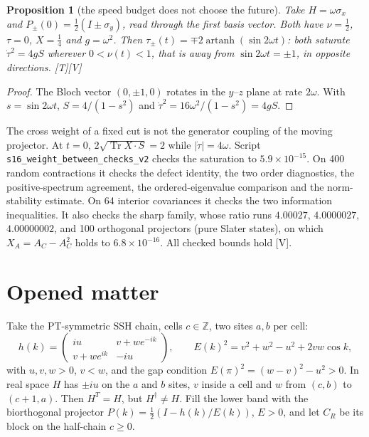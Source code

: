 \documentclass[11pt]{article}
\newtheorem{proposition}[theorem]{Proposition}
\theoremstyle{definition}
\newcommand{\grade}[1]{\textsf{\small[#1]}}
\newcommand{\Tr}{\operatorname{Tr}}
\begin{document}
\begin{proposition}[the speed budget does not choose the future]\label{prop:joint}
Take $H=\omega\sigma_x$ and $P_\pm(0)=\tfrac12(I\pm\sigma_y)$, read through the first basis vector. Both have $\nu=\tfrac12$, $\tau=0$, $X=\tfrac14$ and $g=\omega^2$. Then $\tau_\pm(t)=\mp2\operatorname{artanh}(\sin2\omega t)$: both saturate $\dot\tau^2=4gS$ wherever $0<\nu(t)<1$, that is away from $\sin2\omega t=\pm1$, in opposite directions. \grade{T}\grade{V}
\end{proposition}
\begin{proof}
The Bloch vector $(0,\pm1,0)$ rotates in the $y$--$z$ plane at rate $2\omega$. With $s=\sin2\omega t$, $S=4/(1-s^2)$ and $\dot\tau^2=16\omega^2/(1-s^2)=4gS$.
\end{proof}
The cross weight of a fixed cut is not the generator coupling of the moving projector. At $t=0$, $2\sqrt{\Tr X\cdot S}=2$ while $|\dot\tau|=4\omega$. Script \texttt{s16\_weight\_between\_checks\_v2} checks the saturation to $5.9\times10^{-15}$. On 400 random contractions it checks the defect identity, the two order diagnostics, the positive-spectrum agreement, the ordered-eigenvalue comparison and the norm-stability estimate. On 64 interior covariances it checks the two information inequalities. It also checks the sharp family, whose ratio runs $4.00027$, $4.0000027$, $4.00000002$, and 100 orthogonal projectors (pure Slater states), on which $X_A=A_C-A_C^2$ holds to $6.8\times10^{-16}$. All checked bounds hold \grade{V}.

\section{Opened matter}\label{sec:opened}
Take the PT-symmetric SSH chain, cells $c\in\mathbb Z$, two sites $a,b$ per cell:
\[
h(k)=\begin{pmatrix}iu&v+we^{-ik}\\ v+we^{ik}&-iu\end{pmatrix},\qquad E(k)^2=v^2+w^2-u^2+2vw\cos k,
\]
with $u,v,w>0$, $v<w$, and the gap condition $E(\pi)^2=(w-v)^2-u^2>0$. In real space $H$ has $\pm iu$ on the $a$ and $b$ sites, $v$ inside a cell and $w$ from $(c,b)$ to $(c+1,a)$. Then $H^T=H$, but $H^\dagger\ne H$. Fill the lower band with the biorthogonal projector $P(k)=\tfrac12(I-h(k)/E(k))$, $E>0$, and let $C_R$ be its block on the half-chain $c\ge0$.
\end{document}
